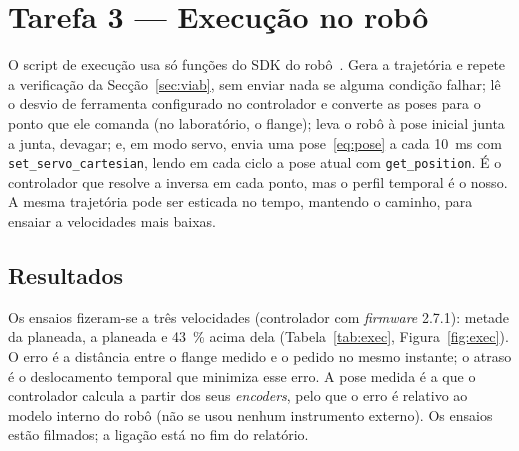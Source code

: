 \section{Tarefa 3 --- Execução no robô}
\label{sec:exec}

O script de execução usa só funções do SDK do robô~\cite{xarm_sdk}. Gera a
trajetória e repete a verificação da Secção~\ref{sec:viab}, sem enviar nada
se alguma condição falhar; lê o desvio de ferramenta configurado no
controlador e converte as poses para o ponto que ele comanda (no laboratório,
o flange); leva o robô à pose inicial junta a junta, devagar; e, em modo
servo, envia uma pose~\eqref{eq:pose} a cada \SI{10}{\milli\second} com
\texttt{set\_servo\_cartesian}, lendo em cada ciclo a pose atual com
\texttt{get\_position}. É o controlador que resolve a inversa em cada ponto,
mas o perfil temporal é o nosso. A mesma trajetória pode ser esticada no
tempo, mantendo o caminho, para ensaiar a velocidades mais baixas.

\subsection{Resultados}

Os ensaios fizeram-se a três velocidades (controlador com \emph{firmware}
2.7.1): metade da planeada, a planeada e \SI{43}{\percent} acima dela
(Tabela~\ref{tab:exec}, Figura~\ref{fig:exec}). O erro é a distância entre o
flange medido e o pedido no mesmo instante; o atraso é o deslocamento
temporal que minimiza esse erro. A pose medida é a que o controlador calcula
a partir dos seus \emph{encoders}, pelo que o erro é relativo ao modelo
interno do robô (não se usou nenhum instrumento externo). Os ensaios
estão filmados; a ligação está no fim do relatório.

